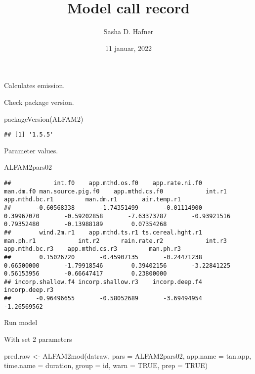 \documentclass[
  landscape]{article}
\title{Model call record}
\author{Sasha D. Hafner}
\date{11 januar, 2022}
\newenvironment{Shaded}{\begin{snugshade}}{\end{snugshade}}
\newcommand{\AttributeTok}[1]{\textcolor[rgb]{0.77,0.63,0.00}{#1}}
\newcommand{\ConstantTok}[1]{\textcolor[rgb]{0.00,0.00,0.00}{#1}}
\newcommand{\FunctionTok}[1]{\textcolor[rgb]{0.00,0.00,0.00}{#1}}
\newcommand{\NormalTok}[1]{#1}
\newcommand{\OtherTok}[1]{\textcolor[rgb]{0.56,0.35,0.01}{#1}}
\newcommand{\StringTok}[1]{\textcolor[rgb]{0.31,0.60,0.02}{#1}}
\begin{document}
\maketitle

Calculates emission.

Check package version.

\begin{Shaded}
\begin{Highlighting}[]
\FunctionTok{packageVersion}\NormalTok{(}\StringTok{\textquotesingle{}ALFAM2\textquotesingle{}}\NormalTok{)}
\end{Highlighting}
\end{Shaded}

\begin{verbatim}
## [1] '1.5.5'
\end{verbatim}

Parameter values.

\begin{Shaded}
\begin{Highlighting}[]
\NormalTok{ALFAM2pars02}
\end{Highlighting}
\end{Shaded}

\begin{verbatim}
##            int.f0    app.mthd.os.f0    app.rate.ni.f0         man.dm.f0 man.source.pig.f0    app.mthd.cs.f0            int.r1    app.mthd.bc.r1         man.dm.r1       air.temp.r1 
##       -0.60568338       -1.74351499       -0.01114900        0.39967070       -0.59202858       -7.63373787       -0.93921516        0.79352480       -0.13988189        0.07354268 
##        wind.2m.r1    app.mthd.ts.r1 ts.cereal.hght.r1         man.ph.r1            int.r2      rain.rate.r2            int.r3    app.mthd.bc.r3    app.mthd.cs.r3         man.ph.r3 
##        0.15026720       -0.45907135       -0.24471238        0.66500000       -1.79918546        0.39402156       -3.22841225        0.56153956       -0.66647417        0.23800000 
## incorp.shallow.f4 incorp.shallow.r3    incorp.deep.f4    incorp.deep.r3 
##       -0.96496655       -0.58052689       -3.69494954       -1.26569562
\end{verbatim}

Run model

With set 2 parameters

\begin{Shaded}
\begin{Highlighting}[]
\NormalTok{pred.raw }\OtherTok{\textless{}{-}} \FunctionTok{ALFAM2mod}\NormalTok{(datraw, }\AttributeTok{pars =}\NormalTok{ ALFAM2pars02, }\AttributeTok{app.name =} \StringTok{\textquotesingle{}tan.app\textquotesingle{}}\NormalTok{, }\AttributeTok{time.name =} \StringTok{\textquotesingle{}duration\textquotesingle{}}\NormalTok{, }
                  \AttributeTok{group =} \StringTok{\textquotesingle{}id\textquotesingle{}}\NormalTok{, }\AttributeTok{warn =} \ConstantTok{TRUE}\NormalTok{, }\AttributeTok{prep =} \ConstantTok{TRUE}\NormalTok{)}
\end{Highlighting}
\end{Shaded}
\end{document}
